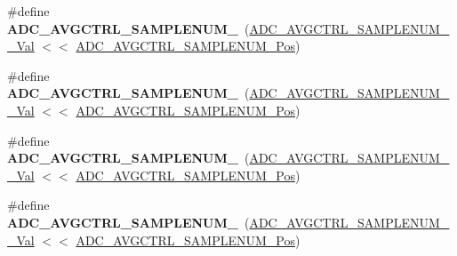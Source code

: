 \begin{DoxyCompactItemize}
\item 
\hypertarget{group___s_a_m_l21___a_d_c_ga3380fb38e09008b3df3557b4cd9ddd0c}{}\#define {\bfseries A\+D\+C\+\_\+\+A\+V\+G\+C\+T\+R\+L\+\_\+\+S\+A\+M\+P\+L\+E\+N\+U\+M\+\_}~(\hyperlink{group___s_a_m_l21___a_d_c_gafd0a9b19d5e189c78725643a1cd6fd62}{A\+D\+C\+\_\+\+A\+V\+G\+C\+T\+R\+L\+\_\+\+S\+A\+M\+P\+L\+E\+N\+U\+M\+\_\+\_\+\+Val} $<$$<$ \hyperlink{group___s_a_m_l21___a_d_c_gae24ef894295278762f9293105f06ffb9}{A\+D\+C\+\_\+\+A\+V\+G\+C\+T\+R\+L\+\_\+\+S\+A\+M\+P\+L\+E\+N\+U\+M\+\_\+\+Pos})\label{group___s_a_m_l21___a_d_c_ga3380fb38e09008b3df3557b4cd9ddd0c}

\item 
\hypertarget{group___s_a_m_l21___a_d_c_ga18434217ff35675f7797c86a8e05f653}{}\#define {\bfseries A\+D\+C\+\_\+\+A\+V\+G\+C\+T\+R\+L\+\_\+\+S\+A\+M\+P\+L\+E\+N\+U\+M\+\_}~(\hyperlink{group___s_a_m_l21___a_d_c_ga7576edd68ace767f66faf2f7a1541565}{A\+D\+C\+\_\+\+A\+V\+G\+C\+T\+R\+L\+\_\+\+S\+A\+M\+P\+L\+E\+N\+U\+M\+\_\+\_\+\+Val} $<$$<$ \hyperlink{group___s_a_m_l21___a_d_c_gae24ef894295278762f9293105f06ffb9}{A\+D\+C\+\_\+\+A\+V\+G\+C\+T\+R\+L\+\_\+\+S\+A\+M\+P\+L\+E\+N\+U\+M\+\_\+\+Pos})\label{group___s_a_m_l21___a_d_c_ga18434217ff35675f7797c86a8e05f653}

\item 
\hypertarget{group___s_a_m_l21___a_d_c_gab15b347ffb5b2d2256157467830aa8b6}{}\#define {\bfseries A\+D\+C\+\_\+\+A\+V\+G\+C\+T\+R\+L\+\_\+\+S\+A\+M\+P\+L\+E\+N\+U\+M\+\_}~(\hyperlink{group___s_a_m_l21___a_d_c_ga7ce78bef6c6d6f18e696b10aae7d9dca}{A\+D\+C\+\_\+\+A\+V\+G\+C\+T\+R\+L\+\_\+\+S\+A\+M\+P\+L\+E\+N\+U\+M\+\_\+\_\+\+Val} $<$$<$ \hyperlink{group___s_a_m_l21___a_d_c_gae24ef894295278762f9293105f06ffb9}{A\+D\+C\+\_\+\+A\+V\+G\+C\+T\+R\+L\+\_\+\+S\+A\+M\+P\+L\+E\+N\+U\+M\+\_\+\+Pos})\label{group___s_a_m_l21___a_d_c_gab15b347ffb5b2d2256157467830aa8b6}

\item 
\hypertarget{group___s_a_m_l21___a_d_c_gab9b72e92ee4c7fc84139d31e9cc5b27b}{}\#define {\bfseries A\+D\+C\+\_\+\+A\+V\+G\+C\+T\+R\+L\+\_\+\+S\+A\+M\+P\+L\+E\+N\+U\+M\+\_}~(\hyperlink{group___s_a_m_l21___a_d_c_ga9afcd3280148e12b17f74ac9ef25ff1c}{A\+D\+C\+\_\+\+A\+V\+G\+C\+T\+R\+L\+\_\+\+S\+A\+M\+P\+L\+E\+N\+U\+M\+\_\+\_\+\+Val} $<$$<$ \hyperlink{group___s_a_m_l21___a_d_c_gae24ef894295278762f9293105f06ffb9}{A\+D\+C\+\_\+\+A\+V\+G\+C\+T\+R\+L\+\_\+\+S\+A\+M\+P\+L\+E\+N\+U\+M\+\_\+\+Pos})\label{group___s_a_m_l21___a_d_c_gab9b72e92ee4c7fc84139d31e9cc5b27b}


\end{DoxyCompactItemize}
